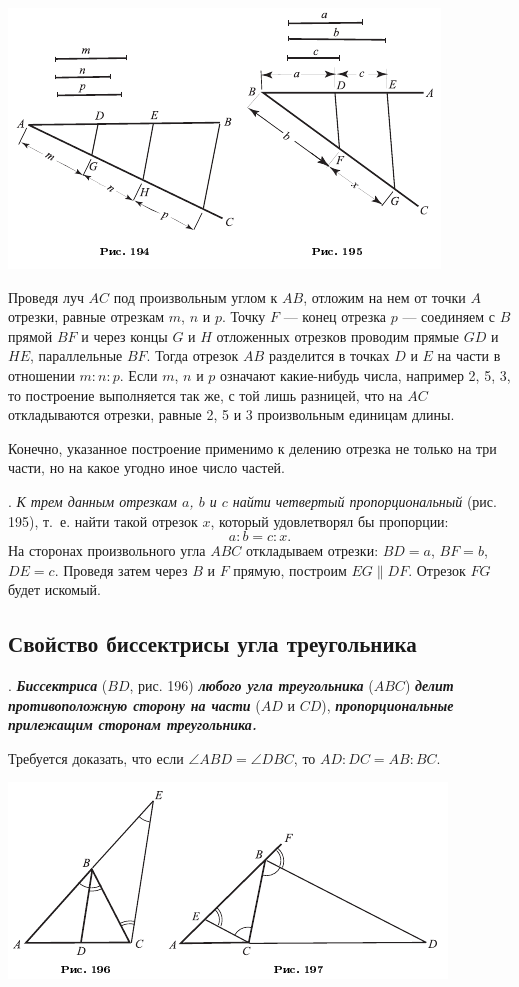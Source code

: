\documentclass[oneside]{book}
\begin{document}
\includegraphics{pics/ris-194-195}

Проведя луч $AC$ под произвольным углом к $AB$, отложим на нем от точки $A$ отрезки, равные отрезкам $m$, $n$ и $p$.
Точку $F$ — конец отрезка $p$ — соединяем с $B$ прямой $BF$ и через концы $G$ и $H$ отложенных отрезков проводим прямые $GD$ и $HE$, параллельные $BF$.
Тогда отрезок $AB$ разделится в точках $D$ и $E$ на части в отношении $m:n:p$.
Если $m$, $n$ и $p$ означают какие-нибудь числа, например 2, 5, 3, то построение выполняется так же, с той лишь разницей, что на $AC$ откладываются отрезки, равные 2, 5 и 3 произвольным единицам длины.

Конечно, указанное построение применимо к делению отрезка не только на три части, но на какое угодно иное число частей.

.
\emph{К трем данным отрезкам $a$, $b$ и $c$ найти четвертый пропорциональный} (рис. 195), т.~е.
найти такой отрезок $x$, который удовлетворял бы пропорции:
\[a:b=c:x.\]
На сторонах произвольного угла $ABC$ откладываем отрезки:
$BD=a$, $BF=b$, $DE=c$.
Проведя затем через $B$ и $F$ прямую, построим $EG\parallel DF$.
Отрезок $FG$ будет искомый.

\subsection*{Свойство биссектрисы угла треугольника}

.
\textbf{\emph{Биссектриса}} ($BD$, рис. 196) \textbf{\emph{любого угла треугольника}} ($ABC$) \textbf{\emph{делит противоположную сторону на части}} ($AD$ и $CD$), \textbf{\emph{пропорциональные прилежащим сторонам треугольника.}}

Требуется доказать, что если $\angle ABD=\angle DBC$, то $AD:DC=AB:BC$.

\includegraphics{pics/ris-196-197}
\end{document}
